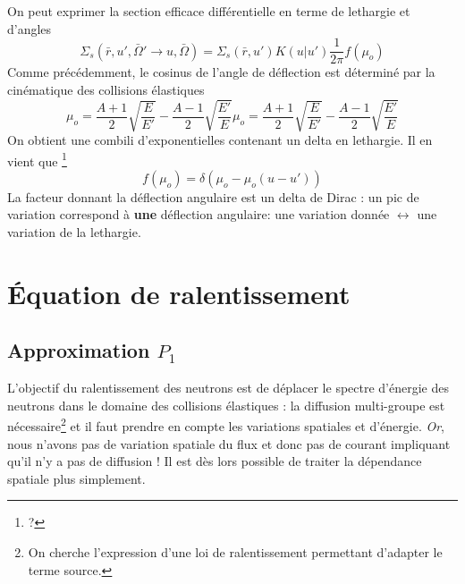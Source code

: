 	On peut exprimer la section efficace différentielle en terme de lethargie et d'angles
	\begin{equation}
	{\Sigma _s}(\bar r,u',\bar \Omega ' \to u,\bar \Omega ) = {\Sigma _s}(\bar r,u')K(u|u')\frac{1}
	{{2\pi }}f({\mu _o})
	\end{equation}
	Comme précédemment, le cosinus de l'angle de déflection est déterminé par la cinématique des 
	collisions élastiques
	\begin{equation}
	{\mu _o} = \frac{{A + 1}}{2}\sqrt {\frac{E}{{E'}}}  - \frac{{A - 1}}{2}\sqrt {\frac{{E'}}{E}} 
	{\mu _o} = \frac{{A + 1}}{2}\sqrt {\frac{E}{{E'}}}  - \frac{{A - 1}}{2}\sqrt {\frac{{E'}}{E}} 
	\end{equation}
	On obtient une combili d'exponentielles contenant un delta en lethargie. Il en vient que
	\footnote{?}
	\begin{equation}
	f({\mu _o}) = \delta ({\mu _o} - {\mu _o}(u - u'))
	\end{equation}
	La facteur donnant la déflection angulaire est un delta de Dirac : un pic de variation correspond
	à \textbf{une} déflection angulaire: une variation donnée $\leftrightarrow$ une variation de 
	la lethargie.


\section{Équation de ralentissement}
	\subsection{Approximation $P_1$}
	L'objectif du ralentissement des neutrons est de déplacer le spectre d'énergie des neutrons dans 
	le domaine des collisions élastiques : la diffusion multi-groupe est nécessaire\footnote{On 
	cherche l'expression d'une loi de ralentissement permettant d'adapter le terme source.} et il faut
	prendre en compte les variations spatiales et d'énergie. \textit{Or}, nous n'avons pas de 
	variation spatiale du flux et donc pas de courant impliquant qu'il n'y a pas de diffusion ! Il 
	est dès lors possible de traiter la dépendance spatiale plus simplement.
	
